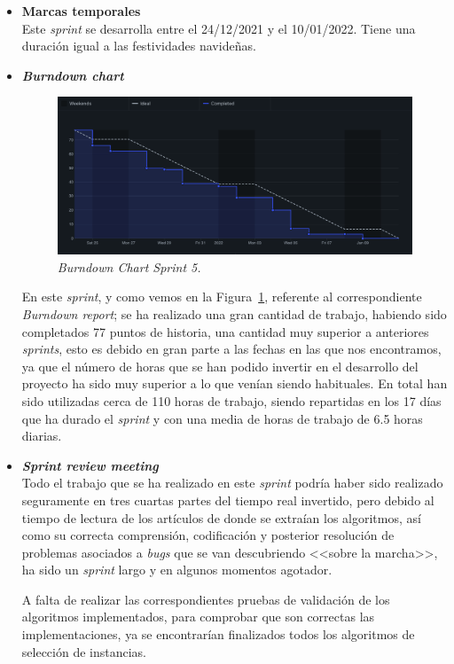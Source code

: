 \begin{itemize}
\item \textbf{Marcas temporales}\\
Este \textit{sprint} se desarrolla entre el 24/12/2021 y el 10/01/2022. Tiene una duración igual a las festividades navideñas.
\item \textbf{\textit{Burndown chart}}\\
\begin{figure}
\begin{center}
\includegraphics[width=\textwidth]{../img/anexos/sprints/BD-Sprint5}
\caption{\textit{Burndown Chart Sprint 5.}}\label{fig:BD-Sprint5}
\end{center}
\end{figure}
En este \textit{sprint}, y como vemos en la Figura~\ref{fig:BD-Sprint5}, referente al correspondiente \textit{Burndown report}; se ha realizado una gran cantidad de trabajo, habiendo sido completados 77 puntos de historia, una cantidad muy superior a anteriores \textit{sprints}, esto es debido en gran parte a las fechas en las que nos encontramos, ya que el número de horas que se han podido invertir en el desarrollo del proyecto ha sido muy superior a lo que venían siendo habituales. En total han sido utilizadas cerca de 110 horas de trabajo, siendo repartidas en los 17 días que ha durado el \textit{sprint} y con una media de horas de trabajo de 6.5 horas diarias. 

\item \textbf{\textit{Sprint review meeting}}\\
Todo el trabajo que se ha realizado en este \textit{sprint} podría haber sido realizado seguramente en tres cuartas partes del tiempo real invertido, pero debido al tiempo de lectura de los artículos de donde se extraían los algoritmos, así como su correcta comprensión, codificación y posterior resolución de problemas asociados a \textit{bugs} que se van descubriendo <<sobre la marcha>>, ha sido un \textit{sprint} largo y en algunos momentos agotador. 

A falta de realizar las correspondientes pruebas de validación de los algoritmos implementados, para comprobar que son correctas las implementaciones, ya se encontrarían finalizados todos los algoritmos de selección de instancias.

\end{itemize}
